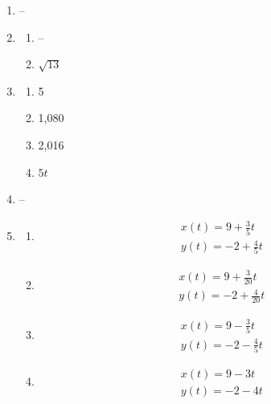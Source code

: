 \documentclass{article}
\begin{document}
\begin{enumerate}
\item --

\item
	\begin{enumerate}
	
	\item --
	
	\item $\sqrt{13}$
	
	\end{enumerate}
	
\item
	\begin{enumerate}
	
	\item 5
	
	\item 1,080
	
	\item 2,016
	
	\item $5t$
	
	\end{enumerate}
	
\item --

\item
	\begin{enumerate}
	
	\item \begin{gather*}
		x(t) = 9 + \frac{3}{5}t \\
		y(t) = -2 + \frac{4}{5}t
		\end{gather*}
	
	\item \begin{gather*}
		x(t) = 9 + \frac{3}{20}t \\
		y(t) = -2 + \frac{4}{20}t
		\end{gather*}
	
	\item \begin{gather*}
		x(t) = 9 - \frac{3}{5}t \\
		y(t) = -2 - \frac{4}{5}t
		\end{gather*}
	
	\item \begin{gather*}
		x(t) = 9 - 3t \\
		y(t) = -2 - 4t
		\end{gather*}
	
	\end{enumerate}
	

\end{enumerate}
\end{document}
